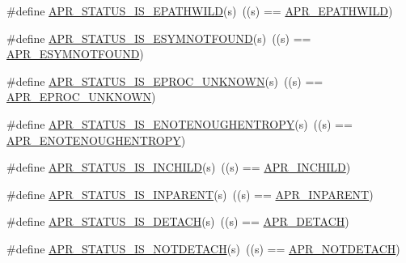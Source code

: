 \begin{DoxyCompactItemize}
\item 
\#define \hyperlink{group___a_p_r___s_t_a_t_u_s___i_s_gae23aedf7ad4e6a111ffd6acf4167b00e}{A\-P\-R\-\_\-\-S\-T\-A\-T\-U\-S\-\_\-\-I\-S\-\_\-\-E\-P\-A\-T\-H\-W\-I\-L\-D}(s)~((s) == \hyperlink{group___a_p_r___error_ga01d0fb965051103b5c8f15a43ad2c767}{A\-P\-R\-\_\-\-E\-P\-A\-T\-H\-W\-I\-L\-D})
\item 
\#define \hyperlink{group___a_p_r___s_t_a_t_u_s___i_s_gafab6c5fe2f9b906d533d253097a16e09}{A\-P\-R\-\_\-\-S\-T\-A\-T\-U\-S\-\_\-\-I\-S\-\_\-\-E\-S\-Y\-M\-N\-O\-T\-F\-O\-U\-N\-D}(s)~((s) == \hyperlink{group___a_p_r___error_ga8d96410fc32408160e1e85e2e96402fa}{A\-P\-R\-\_\-\-E\-S\-Y\-M\-N\-O\-T\-F\-O\-U\-N\-D})
\item 
\#define \hyperlink{group___a_p_r___s_t_a_t_u_s___i_s_gab1267636d1f3fe0dcb79a22b735a5010}{A\-P\-R\-\_\-\-S\-T\-A\-T\-U\-S\-\_\-\-I\-S\-\_\-\-E\-P\-R\-O\-C\-\_\-\-U\-N\-K\-N\-O\-W\-N}(s)~((s) == \hyperlink{group___a_p_r___error_ga01b21dc62b410707f44641d3cea3e6ed}{A\-P\-R\-\_\-\-E\-P\-R\-O\-C\-\_\-\-U\-N\-K\-N\-O\-W\-N})
\item 
\#define \hyperlink{group___a_p_r___s_t_a_t_u_s___i_s_gab8b0af2df80bfb9edfc8dbcbb6bdf925}{A\-P\-R\-\_\-\-S\-T\-A\-T\-U\-S\-\_\-\-I\-S\-\_\-\-E\-N\-O\-T\-E\-N\-O\-U\-G\-H\-E\-N\-T\-R\-O\-P\-Y}(s)~((s) == \hyperlink{group___a_p_r___error_gaaee9e4e763844197e3750bb66ff75cd0}{A\-P\-R\-\_\-\-E\-N\-O\-T\-E\-N\-O\-U\-G\-H\-E\-N\-T\-R\-O\-P\-Y})
\item 
\#define \hyperlink{group___a_p_r___s_t_a_t_u_s___i_s_gad60d170a73ed74ec209a1b2165cacb61}{A\-P\-R\-\_\-\-S\-T\-A\-T\-U\-S\-\_\-\-I\-S\-\_\-\-I\-N\-C\-H\-I\-L\-D}(s)~((s) == \hyperlink{group___a_p_r___error_ga5a2bb63099778699feeae9627474c179}{A\-P\-R\-\_\-\-I\-N\-C\-H\-I\-L\-D})
\item 
\#define \hyperlink{group___a_p_r___s_t_a_t_u_s___i_s_ga4471f8de6eda3a673aa1f306114c012e}{A\-P\-R\-\_\-\-S\-T\-A\-T\-U\-S\-\_\-\-I\-S\-\_\-\-I\-N\-P\-A\-R\-E\-N\-T}(s)~((s) == \hyperlink{group___a_p_r___error_ga79abc0fb43e51e0db87f90fa49745d89}{A\-P\-R\-\_\-\-I\-N\-P\-A\-R\-E\-N\-T})
\item 
\#define \hyperlink{group___a_p_r___s_t_a_t_u_s___i_s_ga64d5d0a6bfe141a387dfdd430a38465b}{A\-P\-R\-\_\-\-S\-T\-A\-T\-U\-S\-\_\-\-I\-S\-\_\-\-D\-E\-T\-A\-C\-H}(s)~((s) == \hyperlink{group___a_p_r___error_gab3f8849983a52f6558016303fb4f5cff}{A\-P\-R\-\_\-\-D\-E\-T\-A\-C\-H})
\item 
\#define \hyperlink{group___a_p_r___s_t_a_t_u_s___i_s_ga3084551fdf84919e3c3db4384234521d}{A\-P\-R\-\_\-\-S\-T\-A\-T\-U\-S\-\_\-\-I\-S\-\_\-\-N\-O\-T\-D\-E\-T\-A\-C\-H}(s)~((s) == \hyperlink{group___a_p_r___error_ga83b8407fb5de5840f51dfd2c1439987b}{A\-P\-R\-\_\-\-N\-O\-T\-D\-E\-T\-A\-C\-H})

\end{DoxyCompactItemize}
